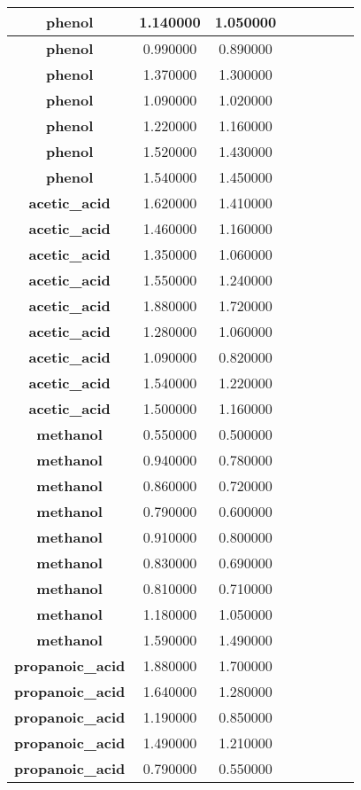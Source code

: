 \documentclass{amsart}
\begin{document}
\begin{center}
\begin{tabular}{c|c|c|c|c|c|c|c}
\textbf{phenol}&1.140000&1.050000 \\ \hline 
\textbf{phenol}&0.990000&0.890000 \\ \hline 
\textbf{phenol}&1.370000&1.300000 \\ \hline 
\textbf{phenol}&1.090000&1.020000 \\ \hline 
\textbf{phenol}&1.220000&1.160000 \\ \hline 
\textbf{phenol}&1.520000&1.430000 \\ \hline 
\textbf{phenol}&1.540000&1.450000 \\ \hline 
\textbf{acetic\_acid}&1.620000&1.410000 \\ \hline 
\textbf{acetic\_acid}&1.460000&1.160000 \\ \hline 
\textbf{acetic\_acid}&1.350000&1.060000 \\ \hline 
\textbf{acetic\_acid}&1.550000&1.240000 \\ \hline 
\textbf{acetic\_acid}&1.880000&1.720000 \\ \hline 
\textbf{acetic\_acid}&1.280000&1.060000 \\ \hline 
\textbf{acetic\_acid}&1.090000&0.820000 \\ \hline 
\textbf{acetic\_acid}&1.540000&1.220000 \\ \hline 
\textbf{acetic\_acid}&1.500000&1.160000 \\ \hline 
\textbf{methanol}&0.550000&0.500000 \\ \hline 
\textbf{methanol}&0.940000&0.780000 \\ \hline 
\textbf{methanol}&0.860000&0.720000 \\ \hline 
\textbf{methanol}&0.790000&0.600000 \\ \hline 
\textbf{methanol}&0.910000&0.800000 \\ \hline 
\textbf{methanol}&0.830000&0.690000 \\ \hline 
\textbf{methanol}&0.810000&0.710000 \\ \hline 
\textbf{methanol}&1.180000&1.050000 \\ \hline 
\textbf{methanol}&1.590000&1.490000 \\ \hline 
\textbf{propanoic\_acid}&1.880000&1.700000 \\ \hline 
\textbf{propanoic\_acid}&1.640000&1.280000 \\ \hline 
\textbf{propanoic\_acid}&1.190000&0.850000 \\ \hline 
\textbf{propanoic\_acid}&1.490000&1.210000 \\ \hline 
\textbf{propanoic\_acid}&0.790000&0.550000 \\ \hline 

\end{tabular}
\end{center}
\end{document}
